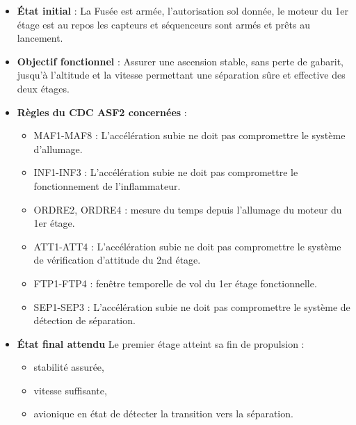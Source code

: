 \vfill

\begin{itemize}
    \item \textbf{État initial} : La Fusée est armée, l'autorisation sol donnée, le moteur du 1er étage est au repos les capteurs et
    séquenceurs sont armés et prêts au lancement.
    \item \textbf{Objectif fonctionnel} : Assurer une ascension stable, sans perte de gabarit, jusqu’à l’altitude et la vitesse
    permettant une séparation sûre et effective des deux étages.
    \item \textbf{Règles du \acrshort{CDC} ASF2 concernées} :
    \begin{itemize}
        \item MAF1-MAF8\cite[p. ~68-70]{CDC_BiEtage} : L'accélération subie ne doit pas compromettre le système d'allumage.
        \item INF1-INF3\cite[p. ~73-75]{CDC_BiEtage} : L'accélération subie ne doit pas compromettre le fonctionnement de l'inflammateur.
        \item ORDRE2, ORDRE4\cite[p. ~78-80]{CDC_BiEtage} : mesure du temps depuis l’allumage du moteur du 1er étage.
        \item ATT1-ATT4\cite[p. ~81-83]{CDC_BiEtage} : L'accélération subie ne doit pas compromettre le système de vérification d’attitude du 2nd étage.
        \item FTP1-FTP4\cite[p. ~84-86]{CDC_BiEtage} : fenêtre temporelle de vol du 1er étage fonctionnelle.
        \item SEP1-SEP3\cite[p. ~87-88]{CDC_BiEtage} : L'accélération subie ne doit pas compromettre le système de détection de séparation.
    \end{itemize}
    \item \textbf{État final attendu} Le premier étage atteint sa fin de propulsion :
    \begin{itemize}
        \item stabilité assurée,
        \item vitesse suffisante,
        \item avionique en état de détecter la transition vers la séparation.
    \end{itemize}
\end{itemize}

\vfill

